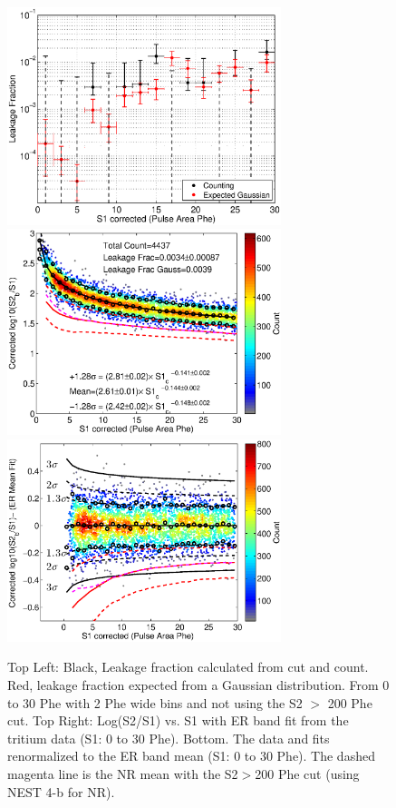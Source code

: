 \begin{figure}[H]\centering
\includegraphics[width=80mm]{CH3T_Leakage_fid_30_lux10_20130813T1120_cp05328_wo200cut_note.eps}
\includegraphics[width=80mm]{CH3T_fid_30_lux10_20130813T1120_cp05328_wo200cut_note.eps}
\includegraphics[width=80mm]{CH3T_fid_30_zoom_lux10_20130813T1120_cp05328_wo200cut_note.eps}
\caption{Top Left: Black, Leakage fraction calculated from cut and count. Red, leakage fraction expected from a Gaussian distribution. From 0 to 30 Phe with 2 Phe wide bins and not using the S2 $>$ 200 Phe cut. Top Right: Log(S2/S1) vs. S1 with ER band fit from the tritium data (S1: 0 to 30 Phe). Bottom. The data and fits renormalized to the ER band mean (S1: 0 to 30 Phe). The dashed magenta line is the NR mean with the S2$>$200 Phe cut (using NEST 4-b for NR).}
\label{fig:Leak_wo_200}
\end{figure}



